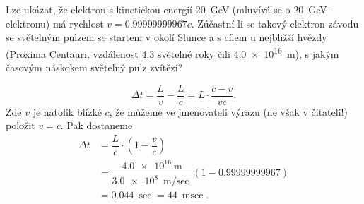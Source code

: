 \begin{mdframed}[style=mdexam]
  \begin{example}\label{fyz:fey_exam019}
    Lze ukázat, že elektron s kinetickou energií \SI{20}{\giga\electronvolt} (mluvívá se o
    \SI{20}{\giga\electronvolt}-elektronu) má rychlost \(v = \num{0.999 999 999 67}c\). Zúčastní-li
    se takový elektron závodu se světelným pulzem se startem v okolí Slunce a s cílem u nejbližší
    hvězdy (Proxima Centauri, vzdálenost \num{4.3} světelné roky čili \SI{4.0e16}{\meter}), s jakým
    časovým náskokem světelný pulz zvítězí?

    \begin{equation*}
      \Delta t = \dfrac{L}{v} - \dfrac{L}{c} = L\cdot\dfrac{c-v}{vc}.
    \end{equation*} 
    Zde \(v\) je natolik blízké \(c\), že můžeme ve jmenovateli výrazu (ne však v čitateli!) položit
    \(v = c\). Pak dostaneme
    \begin{align*}
      \Delta t &=\dfrac{L}{c}\cdot\left(1-\dfrac{v}{c}\right)                                     \\
               &=\dfrac{\SI{4.0e16}{\meter}}{\SI{3.0e8}{\meter\per\sec}}(1-\num{0.999 999 999 67})\\
               &=\SI{0.044}{\sec} = \SI{44}{\milli\sec}.
    \end{align*} 
  \end{example}
\end{mdframed}